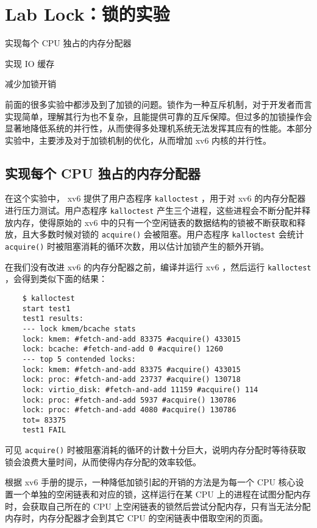 \chapter{Lab Lock：锁的实验}
\begin{introduction}
    \item 实现每个 CPU 独占的内存分配器
    \item 实现 IO 缓存
    \item 减少加锁开销
\end{introduction}

前面的很多实验中都涉及到了加锁的问题。锁作为一种互斥机制，对于开发者而言实现简单，理解其行为也不复杂，且能提供可靠的互斥保障。但过多的加锁操作会显著地降低系统的并行性，从而使得多处理机系统无法发挥其应有的性能。本部分实验中，主要涉及对于加锁机制的优化，从而增加 xv6 内核的并行性。

\section{实现每个 CPU 独占的内存分配器}

在这个实验中， xv6 提供了用户态程序 \lstinline{kalloctest} ，用于对 xv6 的内存分配器进行压力测试。用户态程序 \lstinline{kalloctest} 产生三个进程，这些进程会不断分配并释放内存，使得原始的 xv6 中的只有一个空闲链表的数据结构的锁被不断获取和释放，且大多数时候对锁的 \lstinline{acquire()} 会被阻塞。用户态程序 \lstinline{kalloctest} 会统计 \lstinline{acquire()} 时被阻塞消耗的循环次数，用以估计加锁产生的额外开销。

在我们没有改进 xv6 的内存分配器之前，编译并运行 xv6 ，然后运行 \lstinline{kalloctest} ，会得到类似下面的结果：
\begin{lstlisting}
    $ kalloctest
    start test1
    test1 results:
    --- lock kmem/bcache stats
    lock: kmem: #fetch-and-add 83375 #acquire() 433015
    lock: bcache: #fetch-and-add 0 #acquire() 1260
    --- top 5 contended locks:
    lock: kmem: #fetch-and-add 83375 #acquire() 433015
    lock: proc: #fetch-and-add 23737 #acquire() 130718
    lock: virtio_disk: #fetch-and-add 11159 #acquire() 114
    lock: proc: #fetch-and-add 5937 #acquire() 130786
    lock: proc: #fetch-and-add 4080 #acquire() 130786
    tot= 83375
    test1 FAIL
\end{lstlisting}

可见 \lstinline{acquire()} 时被阻塞消耗的循环的计数十分巨大，说明内存分配时等待获取锁会浪费大量时间，从而使得内存分配的效率较低。

根据 xv6 手册的提示，一种降低加锁引起的开销的方法是为每一个 CPU 核心设置一个单独的空闲链表和对应的锁，这样运行在某 CPU 上的进程在试图分配内存时，会获取自己所在的 CPU 上空闲链表的锁然后尝试分配内存，只有当无法分配内存时，内存分配器才会到其它 CPU 的空闲链表中借取空闲的页面。

